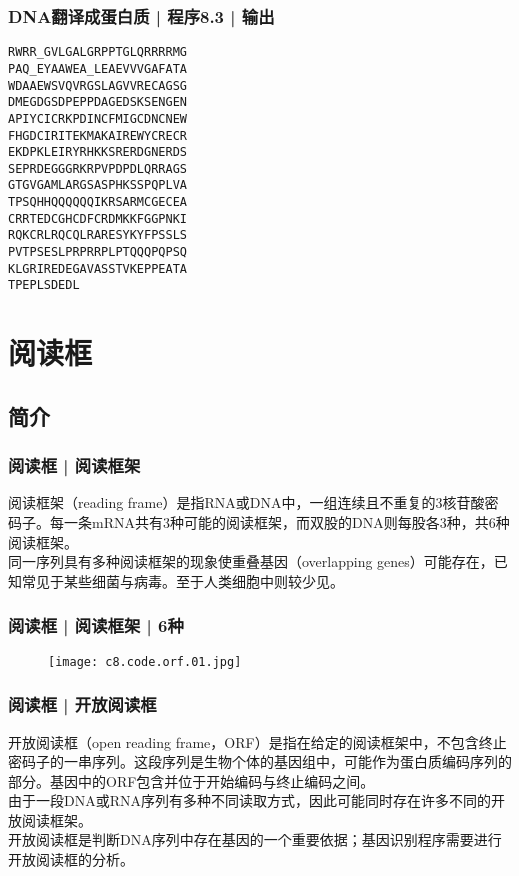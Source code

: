 \begin{frame}[fragile]
  \frametitle{DNA翻译成蛋白质 | 程序8.3 | 输出}
\begin{lstlisting}[firstnumber=1]
RWRR_GVLGALGRPPTGLQRRRRMG
PAQ_EYAAWEA_LEAEVVVGAFATA
WDAAEWSVQVRGSLAGVVRECAGSG
DMEGDGSDPEPPDAGEDSKSENGEN
APIYCICRKPDINCFMIGCDNCNEW
FHGDCIRITEKMAKAIREWYCRECR
EKDPKLEIRYRHKKSRERDGNERDS
SEPRDEGGGRKRPVPDPDLQRRAGS
GTGVGAMLARGSASPHKSSPQPLVA
TPSQHHQQQQQQIKRSARMCGECEA
CRRTEDCGHCDFCRDMKKFGGPNKI
RQKCRLRQCQLRARESYKYFPSSLS
PVTPSESLPRPRRPLPTQQQPQPSQ
KLGRIREDEGAVASSTVKEPPEATA
TPEPLSDEDL
\end{lstlisting}
\end{frame}

\section{阅读框}
\subsection{简介}
\begin{frame}
  \frametitle{阅读框 | 阅读框架}
  阅读框架（reading frame）是指RNA或DNA中，一组连续且不重复的3核苷酸密码子。每一条mRNA共有3种可能的阅读框架，而双股的DNA则每股各3种，共6种阅读框架。\\
  \vspace{1em}
  同一序列具有多种阅读框架的现象使重叠基因（overlapping genes）可能存在，已知常见于某些细菌与病毒。至于人类细胞中则较少见。
\end{frame}

\begin{frame}
  \frametitle{阅读框 | 阅读框架 | \alert{6种}}
  \begin{figure}
    \centering
    \texttt{[image: c8.code.orf.01.jpg]}
  \end{figure}
\end{frame}

\begin{frame}
  \frametitle{阅读框 | \alert{开放阅读框}}
  开放阅读框（open reading frame，ORF）是指在给定的阅读框架中，不包含终止密码子的一串序列。这段序列是生物个体的基因组中，可能作为蛋白质编码序列的部分。基因中的ORF包含并位于开始编码与终止编码之间。\\
  \vspace{1em}
  由于一段DNA或RNA序列有多种不同读取方式，因此可能同时存在许多不同的开放阅读框架。\\
  \vspace{1em}
  开放阅读框是判断DNA序列中存在基因的一个重要依据；基因识别程序需要进行开放阅读框的分析。
\end{frame}

